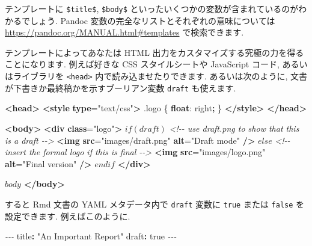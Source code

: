 \documentclass[
  11pt,
  lualatex,ja=standard,jafont=noto]{bxjsreport}
\newenvironment{Shaded}{\begin{snugshade}}{\end{snugshade}}
\newcommand{\AttributeTok}[1]{\textcolor[rgb]{0.77,0.63,0.00}{#1}}
\newcommand{\CharTok}[1]{\textcolor[rgb]{0.31,0.60,0.02}{#1}}
\newcommand{\CommentTok}[1]{\textcolor[rgb]{0.56,0.35,0.01}{\textit{#1}}}
\newcommand{\DecValTok}[1]{\textcolor[rgb]{0.00,0.00,0.81}{#1}}
\newcommand{\ErrorTok}[1]{\textcolor[rgb]{0.64,0.00,0.00}{\textbf{#1}}}
\newcommand{\FunctionTok}[1]{\textcolor[rgb]{0.00,0.00,0.00}{#1}}
\newcommand{\KeywordTok}[1]{\textcolor[rgb]{0.13,0.29,0.53}{\textbf{#1}}}
\newcommand{\NormalTok}[1]{#1}
\newcommand{\OperatorTok}[1]{\textcolor[rgb]{0.81,0.36,0.00}{\textbf{#1}}}
\newcommand{\OtherTok}[1]{\textcolor[rgb]{0.56,0.35,0.01}{#1}}
\newcommand{\PreprocessorTok}[1]{\textcolor[rgb]{0.56,0.35,0.01}{\textit{#1}}}
\newcommand{\StringTok}[1]{\textcolor[rgb]{0.31,0.60,0.02}{#1}}
\begin{document}
テンプレートに \texttt{\$title\$}, \texttt{\$body\$} といったいくつかの変数が含まれているのがわかるでしょう. Pandoc 変数の完全なリストとそれぞれの意味については \url{https://pandoc.org/MANUAL.html\#templates} で検索できます.

テンプレートによってあなたは HTML 出力をカスタマイズする究極の力を得ることになります. 例えば好きな CSS スタイルシートや JavaScript コード, あるいはライブラリを \texttt{\textless{}head\textgreater{}} 内で読み込ませたりできます. あるいは次のように, 文書が下書きか最終稿かを示すブーリアン変数 \texttt{draft} も使えます.

\begin{Shaded}
\begin{Highlighting}[]
\KeywordTok{\textless{}head\textgreater{}}
\KeywordTok{\textless{}style} \ErrorTok{type}\OtherTok{=}\StringTok{"text/css"}\KeywordTok{\textgreater{}}
\FunctionTok{.logo}\NormalTok{ \{}
  \KeywordTok{float}\NormalTok{: }\DecValTok{right}\OperatorTok{;}
\NormalTok{\}}
\KeywordTok{\textless{}/style\textgreater{}}
\KeywordTok{\textless{}/head\textgreater{}}

\KeywordTok{\textless{}body\textgreater{}}
\KeywordTok{\textless{}div} \ErrorTok{class}\OtherTok{=}\StringTok{"logo"}\KeywordTok{\textgreater{}}
\NormalTok{$if(draft)$}
\CommentTok{\textless{}!{-}{-} use draft.png to show that this is a draft {-}{-}\textgreater{}}
\KeywordTok{\textless{}img} \ErrorTok{src}\OtherTok{=}\StringTok{"images/draft.png"} \ErrorTok{alt}\OtherTok{=}\StringTok{"Draft mode"} \KeywordTok{/\textgreater{}}
\NormalTok{$else$}
\CommentTok{\textless{}!{-}{-} insert the formal logo if this is final {-}{-}\textgreater{}}
\KeywordTok{\textless{}img} \ErrorTok{src}\OtherTok{=}\StringTok{"images/logo.png"} \ErrorTok{alt}\OtherTok{=}\StringTok{"Final version"} \KeywordTok{/\textgreater{}}
\NormalTok{$endif$}
\KeywordTok{\textless{}/div\textgreater{}}

\NormalTok{$body$}
\KeywordTok{\textless{}/body\textgreater{}}
\end{Highlighting}
\end{Shaded}

すると Rmd 文書の YAML メタデータ内で \texttt{draft} 変数に \texttt{true} または \texttt{false} を設定できます. 例えばこのように.

\begin{Shaded}
\begin{Highlighting}[]
\PreprocessorTok{{-}{-}{-}}
\FunctionTok{title}\KeywordTok{:}\AttributeTok{ }\StringTok{"An Important Report"}
\FunctionTok{draft}\KeywordTok{:}\AttributeTok{ }\CharTok{true}
\PreprocessorTok{{-}{-}{-}}
\end{Highlighting}
\end{Shaded}
\end{document}
